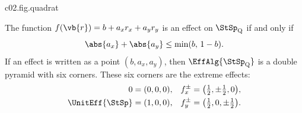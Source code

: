 \begin{tpcfigure}{c02.fig.quadrat}
  \caption{The square bit. (a) The centre of the square lies on both diagonals; it is
    midway between $s_{00}$ and $s_{11}$ and also midway between $s_{10}$ and $s_{01}$, as
    in equation~\eqref{c02.eq.quadrat-mitte}. (b) The level lines of the extreme effect
    $f_x^{+}$ of Proposition~\ref{c02.prop.quadrat}: it has the value $1$ on the right
    edge and the value $0$ on the left edge.}
\end{tpcfigure}

\begin{proposition}\label{c02.prop.quadrat}
  The function $f(\vb{r}) = b + a_x r_x + a_y r_y$ is an effect on $\StSp_{\mathrm{Q}}$ if
  and only if
  \begin{equation}\label{c02.eq.quadrat-effekt}
    \abs{a_x} + \abs{a_y} \leq \min(b,\, 1-b) .
  \end{equation}
  If an effect is written as a point $(b, a_x, a_y)$, then
  $\EffAlg{\StSp_{\mathrm{Q}}}$ is a double pyramid with six corners. These six corners are
  the extreme effects:
  \begin{equation}\label{c02.eq.quadrat-extremal}
    \begin{aligned}
      0 &= (0,0,0), & f_x^{\pm} &= \bigl(\tfrac12, \pm\tfrac12, 0\bigr), \\
      \UnitEff{\StSp} &= (1,0,0), & f_y^{\pm} &= \bigl(\tfrac12, 0, \pm\tfrac12\bigr) .
    \end{aligned}
  \end{equation}
\end{proposition}
